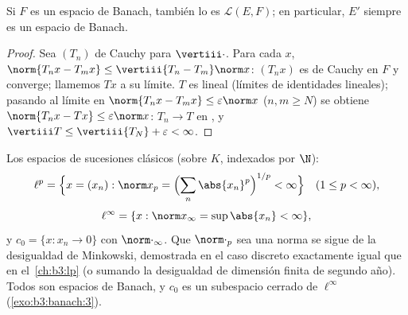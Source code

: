 \begin{proposition}\label{prop:b3:banach:llcomplete}
Si $F$ es un espacio de Banach, también lo es $\mathcal L(E, F)$; en
particular, $E'$ siempre es un espacio de Banach.
\end{proposition}

\begin{proof}
Sea $(T_n)$ de Cauchy para $\vertiii\cdot$. Para cada $x$,
$\norm{T_nx - T_mx} \leq \vertiii{T_n - T_m}\norm x$: $(T_nx)$
es de Cauchy en $F$ y converge; llamemos $Tx$ a su límite. $T$ es lineal
(límites de identidades lineales); pasando al límite en
$\norm{T_nx - T_mx} \leq \varepsilon\norm x$ ($n, m \geq N$)
se obtiene $\norm{T_nx - Tx} \leq \varepsilon\norm x$: $T_n \to T$ en
, y
$\vertiii T \leq \vertiii{T_N} +
\varepsilon < \infty$.
\end{proof}

\begin{definition}\label{def:b3:banach:lp}
Los espacios de sucesiones clásicos (sobre $K$, indexados por $\N$):
\[
\ell^p = \Bigl\{x = (x_n) : \norm x_p = \Bigl(\sum_n
\abs{x_n}^p\Bigr)^{1/p} < \infty\Bigr\}\quad (1 \leq p <
\infty),
\]
\[
\ell^\infty = \{x : \norm x_\infty = \sup\abs{x_n} < \infty\},
\]
y $c_0 = \{x : x_n \to 0\}$ con $\norm\cdot_\infty$. Que $\norm\cdot_p$
sea una norma se sigue de la desigualdad de Minkowski, demostrada en el
caso discreto exactamente igual que en el~\cref{ch:b3:lp} (o sumando la
desigualdad de dimensión finita de segundo año). Todos son espacios de
Banach, y $c_0$ es un subespacio cerrado de
$\ell^\infty$ (\cref{exo:b3:banach:3}).
\end{definition}

